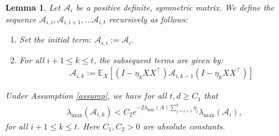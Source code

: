 \documentclass[11pt, reqno,english]{amsart}
\newtheorem{lemma}{Lemma}[section]
\begin{document}
\begin{lemma}\label{conchelper}
Let $\mathcal A_i$ be a positive definite, symmetric matrix.
We define the sequence $\mathcal A_{i,i}, \mathcal A_{i,i+1}, \dots \mathcal A_{i,t}$ recursively as follows:
\begin{enumerate}
    \item Set the initial term: $\mathcal A_{i,i} := \mathcal A_i$.
    \item For all $i+1 \leq k \leq t$, the subsequent terms are given by:
    \begin{align*}
    \mathcal A_{i,k} := \mathbb{E}_X\left[(I - \eta_{k}XX^\top)\mathcal A_{i,k-1}(I - \eta_{k}XX^\top)\right]
    \end{align*}
\end{enumerate}
Under Assumption \ref{assump}, we have for all $t,d \geq C_1$ that
\begin{align*}
\lambda_{\max}(\mathcal A_{i,k}) < C_2e^{-2\lambda_{\min}(A)\sum_{j = i+1}^k\eta_j} \lambda_{\max}(\mathcal A_i),
\end{align*}
for all $i+1 \leq k \leq t$. Here $C_1, C_2 > 0$ are absolute constants.
\end{lemma}
\end{document}
